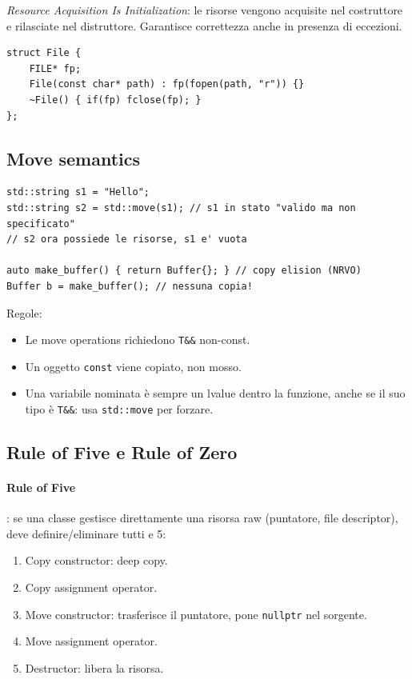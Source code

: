 \documentclass[11pt,a4paper]{article}
\theoremstyle{remark}
\begin{document}
\emph{Resource Acquisition Is Initialization}: le risorse vengono acquisite nel costruttore e rilasciate nel distruttore. Garantisce correttezza anche in presenza di eccezioni.

\begin{lstlisting}
struct File {
    FILE* fp;
    File(const char* path) : fp(fopen(path, "r")) {}
    ~File() { if(fp) fclose(fp); }
};
\end{lstlisting}

\subsection{Move semantics}

\begin{lstlisting}
std::string s1 = "Hello";
std::string s2 = std::move(s1); // s1 in stato "valido ma non specificato"
// s2 ora possiede le risorse, s1 e' vuota

auto make_buffer() { return Buffer{}; } // copy elision (NRVO)
Buffer b = make_buffer(); // nessuna copia!
\end{lstlisting}

Regole:
\begin{itemize}
  \item Le move operations richiedono \texttt{T\&\&} non-const.
  \item Un oggetto \texttt{const} viene copiato, non mosso.
  \item Una variabile nominata è sempre un lvalue dentro la funzione, anche se il suo tipo è \texttt{T\&\&}: usa \texttt{std::move} per forzare.
\end{itemize}

\subsection{Rule of Five e Rule of Zero}

\paragraph{Rule of Five}: se una classe gestisce direttamente una risorsa raw (puntatore, file descriptor), deve definire/eliminare tutti e 5:
\begin{enumerate}
  \item Copy constructor: deep copy.
  \item Copy assignment operator.
  \item Move constructor: trasferisce il puntatore, pone \texttt{nullptr} nel sorgente.
  \item Move assignment operator.
  \item Destructor: libera la risorsa.
\end{enumerate}
\end{document}
